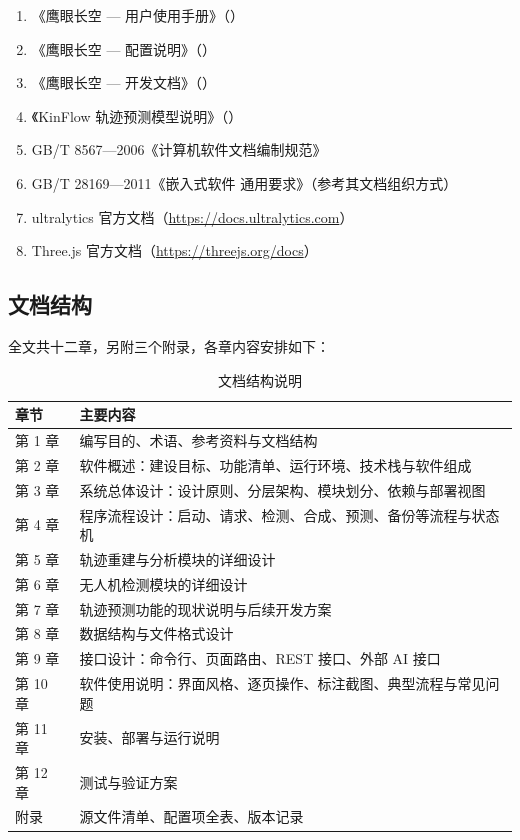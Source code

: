 \begin{enumerate}
  \item 《鹰眼长空 — 用户使用手册》（）
  \item 《鹰眼长空 — 配置说明》（）
  \item 《鹰眼长空 — 开发文档》（）
  \item 《KinFlow 轨迹预测模型说明》（）
  \item GB/T 8567—2006《计算机软件文档编制规范》
  \item GB/T 28169—2011《嵌入式软件 通用要求》（参考其文档组织方式）
  \item ultralytics 官方文档（\url{https://docs.ultralytics.com}）
  \item Three.js 官方文档（\url{https://threejs.org/docs}）
\end{enumerate}

\subsection{文档结构}

全文共十二章，另附三个附录，各章内容安排如下：

\begin{table}[H]
\centering
\caption{文档结构说明}
\label{tab:docstructure}
\small
\begin{tabularx}{\linewidth}{@{}>{\heiti}p{2.6cm}X@{}}
\toprule
章节 & 主要内容 \\
\midrule
第 1 章 & 编写目的、术语、参考资料与文档结构 \\
第 2 章 & 软件概述：建设目标、功能清单、运行环境、技术栈与软件组成 \\
第 3 章 & 系统总体设计：设计原则、分层架构、模块划分、依赖与部署视图 \\
第 4 章 & 程序流程设计：启动、请求、检测、合成、预测、备份等流程与状态机 \\
第 5 章 & 轨迹重建与分析模块的详细设计 \\
第 6 章 & 无人机检测模块的详细设计 \\
第 7 章 & 轨迹预测功能的现状说明与后续开发方案 \\
第 8 章 & 数据结构与文件格式设计 \\
第 9 章 & 接口设计：命令行、页面路由、REST 接口、外部 AI 接口 \\
第 10 章 & 软件使用说明：界面风格、逐页操作、标注截图、典型流程与常见问题 \\
第 11 章 & 安装、部署与运行说明 \\
第 12 章 & 测试与验证方案 \\
附录 & 源文件清单、配置项全表、版本记录 \\
\bottomrule
\end{tabularx}
\end{table}
